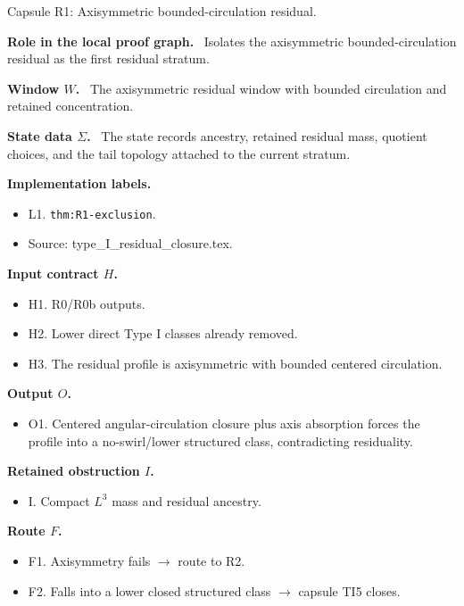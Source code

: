 \documentclass[11pt]{amsart}
\newcommand{\capsulefield}[1]{\par\smallskip\noindent\textbf{#1.}\ }
\begin{document}
\begin{proofcapsule}{Capsule R1: Axisymmetric bounded-circulation residual.}
  \capsulefield{Role in the local proof graph}
  Isolates the axisymmetric bounded-circulation residual as the first residual stratum.

  \capsulefield{Window \(W\)}
The axisymmetric residual window with bounded circulation and retained concentration.

  \capsulefield{State data \(\Sigma\)}
The state records ancestry, retained residual mass, quotient choices, and the tail topology attached to the current stratum.

  \capsulefield{Implementation labels}
  \begin{itemize}[leftmargin=1.8em]
  \item L1. \texttt{thm:R1-exclusion}.
  \item Source: type\_I\_residual\_closure.tex.
  \end{itemize}

  \capsulefield{Input contract \(H\)}
  \begin{itemize}[leftmargin=1.8em]
  \item H1. R0/R0b outputs.
  \item H2. Lower direct Type I classes already removed.
  \item H3. The residual profile is axisymmetric with bounded centered circulation.
  \end{itemize}

  \capsulefield{Output \(O\)}
  \begin{itemize}[leftmargin=1.8em]
  \item O1. Centered angular-circulation closure plus axis absorption forces the profile into a no-swirl/lower structured class, contradicting residuality.
  \end{itemize}

  \capsulefield{Retained obstruction \(I\)}
  \begin{itemize}[leftmargin=1.8em]
  \item I. Compact $L^3$ mass and residual ancestry.
  \end{itemize}

  \capsulefield{Route \(F\)}
  \begin{itemize}[leftmargin=1.8em]
  \item F1. Axisymmetry fails $\to$ route to R2.
  \item F2. Falls into a lower closed structured class $\to$ capsule TI5 closes.
  \end{itemize}


\end{proofcapsule}
\end{document}
